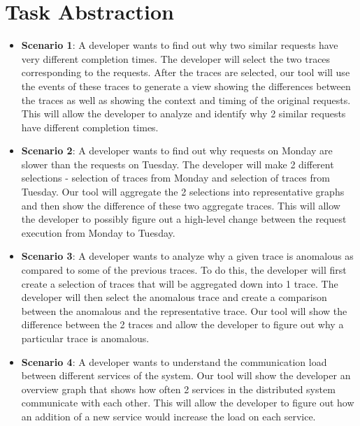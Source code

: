 \section{Task Abstraction}

\begin{itemize}
\item \textbf{Scenario 1}: A developer wants to find out why two similar requests have very different 
completion times. The developer will select the two traces corresponding to the requests. After the traces are selected, our tool will
use the events of these traces to generate a view showing the differences between the traces as well as showing the
context and timing of the original requests. This will allow the developer to analyze and identify why 2 similar requests have 
different completion times.

\item \textbf{Scenario 2}: A developer wants to find out why requests on Monday are
slower than the requests on Tuesday. The developer will make 2 different selections - selection of traces from Monday and selection
of traces from Tuesday. Our tool will aggregate the 2 selections into representative graphs and then show the difference of these
two aggregate traces. This will allow the developer to possibly figure out a high-level change between the request execution from
Monday to Tuesday.

\item \textbf{Scenario 3}: A developer wants to analyze why a given trace is anomalous as compared to some of the previous
traces. To do this, the developer will first create a selection of traces that will be aggregated down into 1 trace. The developer
will then select the anomalous trace and create a comparison between the anomalous and the representative trace.
Our tool will show the difference between the 2 traces and allow the developer to figure out why a particular trace is anomalous.

\item \textbf{Scenario 4}: A developer wants to understand the communication load between different services of the system.
Our tool will show the developer an overview graph that shows how often 2 services in the distributed system communicate
with each other. This will allow the developer to figure out how an addition of a new service would increase the load on each
service.

\end{itemize}